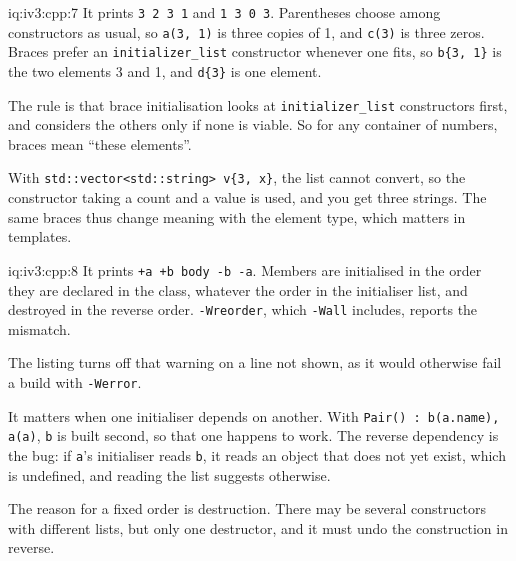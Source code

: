 \begin{solution}{iq:iv3:cpp:7}
It prints \texttt{3 2 3 1} and \texttt{1 3 0 3}. Parentheses choose among constructors as usual, so \texttt{a(3, 1)} is three copies of 1, and \texttt{c(3)} is three zeros. Braces prefer an \texttt{initializer\_list} constructor whenever one fits, so \texttt{b\{3, 1\}} is the two elements 3 and 1, and \texttt{d\{3\}} is one element.

The rule is that brace initialisation looks at \texttt{initializer\_list} constructors first, and considers the others only if none is viable. So for any container of numbers, braces mean ``these elements''.

With \texttt{std::vector<std::string> v\{3, \textquotedbl{}x\textquotedbl{}\}}, the list cannot convert, so the constructor taking a count and a value is used, and you get three strings. The same braces thus change meaning with the element type, which matters in templates.

\end{solution}

\begin{solution}{iq:iv3:cpp:8}
It prints \texttt{+a +b body -b -a}. Members are initialised in the order they are declared in the class, whatever the order in the initialiser list, and destroyed in the reverse order. \texttt{-Wreorder}, which \texttt{-Wall} includes, reports the mismatch.

The listing turns off that warning on a line not shown, as it would otherwise fail a build with \texttt{-Werror}.

It matters when one initialiser depends on another. With \texttt{Pair() : b(a.name), a(\textquotedbl{}a\textquotedbl{})}, \texttt{b} is built second, so that one happens to work. The reverse dependency is the bug: if \texttt{a}'s initialiser reads \texttt{b}, it reads an object that does not yet exist, which is undefined, and reading the list suggests otherwise.

The reason for a fixed order is destruction. There may be several constructors with different lists, but only one destructor, and it must undo the construction in reverse.

\end{solution}

